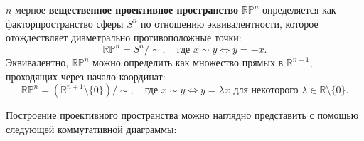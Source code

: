 \begin{definition}
$n$-мерное \textbf{вещественное проективное пространство} $ \mathbb{RP}^n $ определяется как факторпространство сферы $ S^n $ по отношению эквивалентности, которое отождествляет диаметрально противоположные точки:
\[
\mathbb{RP}^n = S^n / \sim, \quad \text{где } x \sim y \iff y = -x.
\]
Эквивалентно, $ \mathbb{RP}^n $ можно определить как множество прямых в $ \mathbb{R}^{n+1} $, проходящих через начало координат:
\[
\mathbb{RP}^n = (\mathbb{R}^{n+1} \setminus \{0\}) / \sim, \quad \text{где } x \sim y \iff y = \lambda x \text{ для некоторого } \lambda \in \mathbb{R} \setminus \{0\}.
\]
\end{definition}


Построение проективного пространства можно наглядно представить с помощью следующей коммутативной диаграммы:

